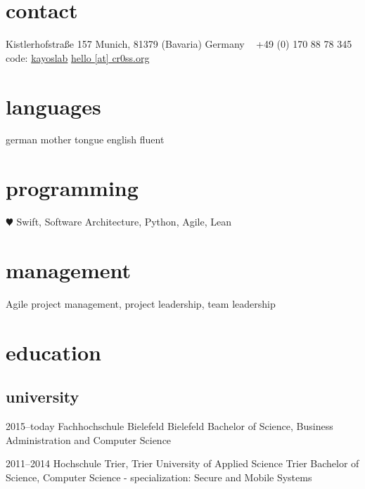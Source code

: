 \documentclass[]{friggeri-cv} %
\begin{document}


\begin{aside} %
	\section{contact}
	Kistlerhofstraße 157
	Munich, 81379 
	(Bavaria) Germany
	~
	+49 (0) 170 88 78 345
	code: \href{https://github.com/kayoslab}{kayoslab}
	\href{mailto:hello@cr0ss.org}{hello [at] cr0ss.org}
	~
	\section{languages}
	german mother tongue
	english fluent
	\section{programming}
	{\color{red} $\varheartsuit$} Swift,
	Software Architecture,
	Python, Agile, Lean
	\section{management}
	Agile project management,
	project leadership,
	team leadership
\end{aside}


\section{education}

\subsection{university}

\begin{entrylist}
	
	\entry
	{2015--today}
	{Fachhochschule Bielefeld}
	{Bielefeld}
	{Bachelor of Science, Business Administration and Computer Science}
	
	
	\entry
	{2011--2014}
	{Hochschule Trier, Trier University of Applied Science}
	{Trier}
	{Bachelor of Science, Computer Science - specialization: Secure and Mobile Systems}
	
	
\end{entrylist}
\end{document}
